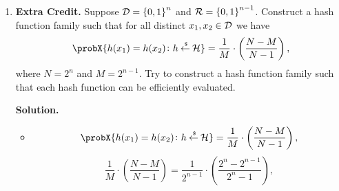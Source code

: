 \documentclass[11pt]{article}
\newcommand{\nextoddpage}{\checkoddpage\ifoddpage{\ \newpage\ \newpage}\else{\ \newpage}\fi}
\begin{document}
\begin{enumerate}
  {\bfseries Solution.} 
  \begin{itemize} 
  \item Suppose $\abs\cD < \abs\cR$: It's clear that $\probX{h(x^*_1)=y^*_1\colon h\getsr\cH} > \frac1{\abs\cR}$ since not every range element is mapped to, and thus that $\probX{h(x^*_1)=y^*_1,h(x^*_2)=y^*_2\colon h\getsr\cH} \geq \frac1{\abs\cR^2}$ \\
  Suppose $\abs\cR <= \abs\cD$: Since the range is smaller than the domain, lets assume every range element is mapped to. Then $\probX{h(x^*_1)=y^*_1\colon h\getsr\cH} \geq \frac1{\abs\cR}$ since each range element is probable, and thus $\probX{h(x^*_1)=y^*_1,h(x^*_2)=y^*_2\colon h\getsr\cH} \geq \frac1{\abs\cR^2}$
  \item Given $\probX{h(x_1)=h(x_2)\colon h\getsr\cH} < \frac1{\abs\cR}$, if $y_1 = y_2$ then $\probX{h(x_1)=y_1,h(x_2)=y_2\colon h\getsr\cH} < \frac1{\abs\cR^2}$ \\
  From part 1, we already know $\probX{h(x_1)=y_1,h(x_2)=y_2\colon h\getsr\cH} \geq \frac1{\abs\cR^2}$ \\
  So, given the constraint $y_1 =\neq y_2$, we know there exists ($x_1, y_1, x_2, y_2$) such that $\probX{h(x_1)=y_1,h(x_2)=y_2\colon h\getsr\cH} > \frac1{\abs\cR^2}$
  \end{itemize}



\nextoddpage 
\item {\bfseries Extra Credit.} 
  Suppose ${\mathcal D}={\{0,1\}}^n$ and ${\mathcal R}={\{0,1\}}^{n-1}$. 
  Construct a hash function family such that for all distinct $x_1,x_2\in{\mathcal D}$ we have 
  $$\probX{h(x_1)=h(x_2)\colon h\getsr\cH} = \frac1M \cdot\left(\frac{N-M}{N-1}\right),$$
  where $N=2^n$ and $M=2^{n-1}$.  
  Try to construct a hash function family such that each hash function can be efficiently evaluated. 
  
  {\bfseries Solution.} 
  \begin{itemize} 
  \item $$\probX{h(x_1)=h(x_2)\colon h\getsr\cH} = \frac1M \cdot\left(\frac{N-M}{N-1}\right),$$
  $$\frac1M \cdot\left(\frac{N-M}{N-1}\right) = \frac1{2^{n-1}} \cdot\left(\frac{2^n-2^{n-1}}{2^n-1}\right),$$
  \end{itemize}
 



\end{enumerate}
\end{document}
